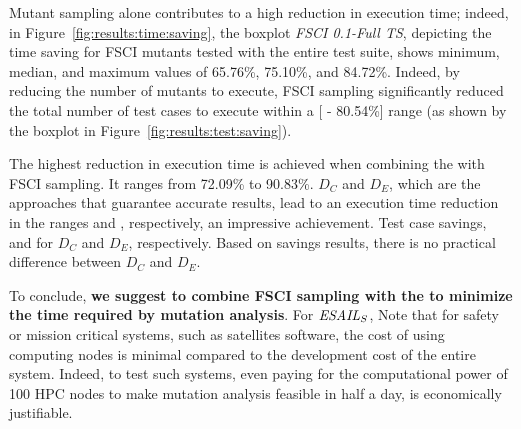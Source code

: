 
Mutant sampling alone contributes to a high reduction in execution time; indeed, in Figure~\ref{fig:results:time:saving}, the boxplot \emph{FSCI 0.1-Full TS}, depicting the time saving for FSCI mutants tested with the entire test suite, shows minimum, median, and maximum values of 65.76\%, 75.10\%, and 84.72\%. Indeed, by reducing the number of mutants to execute, FSCI sampling significantly reduced the total number of test cases to execute within a [ - 80.54\%] range (as shown by the boxplot in Figure~\ref{fig:results:test:saving}).

The highest reduction in execution time is achieved when combining the \MPTS with FSCI sampling. It ranges from 72.09\% to 90.83\%. $D_C$ and $D_E$, which are the approaches that guarantee accurate results, lead to an execution time reduction in the ranges \JMRCHANGE{[75.25\% - 90.83\%]} and \JMRCHANGE{[73.53\% - 90.83\%]}, respectively, an impressive achievement. 
Test case savings, 
 and \JMRCHANGE{[68.08\% - 82.70\%]} for $D_C$ and $D_E$, respectively. Based on savings results, there is no practical difference between $D_C$ and $D_E$.


To conclude, \textbf{we suggest to combine FSCI sampling with the \MPTS to minimize the time required by mutation analysis}. 
For $\mathit{\emph{ESAIL}{}}_S$, 
 Note that for safety or mission critical systems, such as satellites software, the cost of using computing nodes is minimal compared to the development cost of the entire system. Indeed, to test such systems, even paying for the computational power of 100 HPC nodes to make mutation analysis feasible in half a day, is economically justifiable. 


